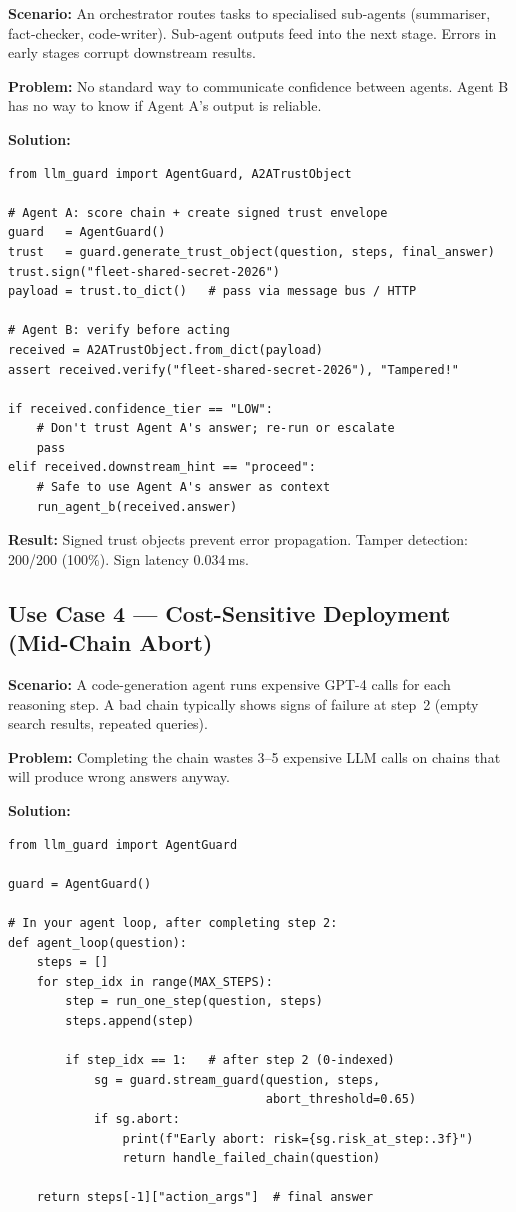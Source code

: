 \documentclass[11pt,a4paper]{article}
\begin{document}
\textbf{Scenario:} An orchestrator routes tasks to specialised sub-agents
(summariser, fact-checker, code-writer). Sub-agent outputs feed into the
next stage. Errors in early stages corrupt downstream results.

\textbf{Problem:} No standard way to communicate confidence between agents.
Agent B has no way to know if Agent A's output is reliable.

\textbf{Solution:}

\begin{lstlisting}
from llm_guard import AgentGuard, A2ATrustObject

# Agent A: score chain + create signed trust envelope
guard   = AgentGuard()
trust   = guard.generate_trust_object(question, steps, final_answer)
trust.sign("fleet-shared-secret-2026")
payload = trust.to_dict()   # pass via message bus / HTTP

# Agent B: verify before acting
received = A2ATrustObject.from_dict(payload)
assert received.verify("fleet-shared-secret-2026"), "Tampered!"

if received.confidence_tier == "LOW":
    # Don't trust Agent A's answer; re-run or escalate
    pass
elif received.downstream_hint == "proceed":
    # Safe to use Agent A's answer as context
    run_agent_b(received.answer)
\end{lstlisting}

\textbf{Result:} Signed trust objects prevent error propagation.
Tamper detection: 200/200 (100\%). Sign latency 0.034\,ms.

\subsection{Use Case 4 --- Cost-Sensitive Deployment (Mid-Chain Abort)}

\textbf{Scenario:} A code-generation agent runs expensive GPT-4 calls for
each reasoning step. A bad chain typically shows signs of failure at step~2
(empty search results, repeated queries).

\textbf{Problem:} Completing the chain wastes 3--5 expensive LLM calls on
chains that will produce wrong answers anyway.

\textbf{Solution:}

\begin{lstlisting}
from llm_guard import AgentGuard

guard = AgentGuard()

# In your agent loop, after completing step 2:
def agent_loop(question):
    steps = []
    for step_idx in range(MAX_STEPS):
        step = run_one_step(question, steps)
        steps.append(step)

        if step_idx == 1:   # after step 2 (0-indexed)
            sg = guard.stream_guard(question, steps,
                                    abort_threshold=0.65)
            if sg.abort:
                print(f"Early abort: risk={sg.risk_at_step:.3f}")
                return handle_failed_chain(question)

    return steps[-1]["action_args"]  # final answer
\end{lstlisting}
\end{document}

